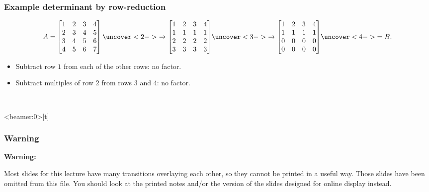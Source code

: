 \documentclass[9pt]{beamer}
\begin{document}
\begin{frame}[t]
 \frametitle{Example determinant by row-reduction}
 
 \[ A =
  \bbm 1&2&3&4 \\
       2&3&4&5 \\
       3&4&5&6 \\
       4&5&6&7 \ebm
  \uc<2->{\xra{}
  \bbm 1&2&3&4 \\
       1&1&1&1 \\
       2&2&2&2 \\
       3&3&3&3 \ebm}
  \uc<3->{\xra{}
  \bbm 1&2&3&4 \\
       1&1&1&1 \\
       0&0&0&0 \\
       0&0&0&0 \ebm}
  \uc<4->{= B.}
 \]
 \begin{itemize}
  \item<2-> Subtract row $1$ from each of the other rows: no factor.
  \item<3-> Subtract multiples of row $2$ from rows $3$ and $4$: no
   factor. 
 \end{itemize}
 \\
\end{frame}

\begin{frame}<beamer:0>[t]
 \frametitle{Warning}

 {\Large\textbf{Warning:}}

 \bigskip

 Most slides for this lecture have many transitions overlaying 
 each other, so they cannot be printed in a useful way.  Those
 slides have been omitted from this file.  You should look at
 the printed notes and/or the version of the slides designed for 
 online display instead.

\end{frame}
\end{document}
